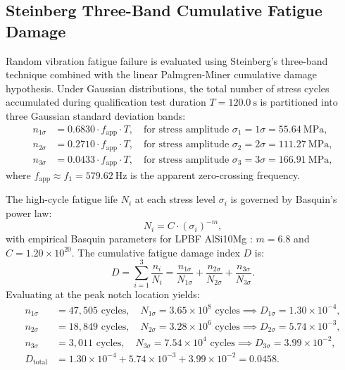 \subsection{Steinberg Three-Band Cumulative Fatigue Damage}

Random vibration fatigue failure is evaluated using Steinberg's three-band technique \cite{steinberg2000} combined with the linear Palmgren-Miner cumulative damage hypothesis. Under Gaussian distributions, the total number of stress cycles accumulated during qualification test duration $T = \SI{120.0}{\second}$ is partitioned into three Gaussian standard deviation bands:
\begin{align}
n_{1\sigma} &= 0.6830 \cdot f_{\text{app}} \cdot T, \quad \text{for stress amplitude } \sigma_1 = 1\sigma = \SI{55.64}{\mega\pascal}, \\
n_{2\sigma} &= 0.2710 \cdot f_{\text{app}} \cdot T, \quad \text{for stress amplitude } \sigma_2 = 2\sigma = \SI{111.27}{\mega\pascal}, \\
n_{3\sigma} &= 0.0433 \cdot f_{\text{app}} \cdot T, \quad \text{for stress amplitude } \sigma_3 = 3\sigma = \SI{166.91}{\mega\pascal},
\end{align}
where $f_{\text{app}} \approx f_1 = \SI{579.62}{\hertz}$ is the apparent zero-crossing frequency.

The high-cycle fatigue life $N_i$ at each stress level $\sigma_i$ is governed by Basquin's power law:
\begin{equation}
N_i = C \cdot (\sigma_i)^{-m},
\label{eq:ch4_basquin_law}
\end{equation}
with empirical Basquin parameters for LPBF AlSi10Mg \cite{collini2024}: $m = 6.8$ and $C = 1.20 \times 10^{20}$.
The cumulative fatigue damage index $D$ is:
\begin{equation}
D = \sum_{i=1}^3 \frac{n_i}{N_i} = \frac{n_{1\sigma}}{N_{1\sigma}} + \frac{n_{2\sigma}}{N_{2\sigma}} + \frac{n_{3\sigma}}{N_{3\sigma}}.
\label{eq:miner_sum}
\end{equation}
Evaluating at the peak notch location yields:
\begin{align}
n_{1\sigma} &= 47{,}505 \text{ cycles}, \quad N_{1\sigma} = 3.65 \times 10^8 \text{ cycles} \implies D_{1\sigma} = 1.30 \times 10^{-4}, \\
n_{2\sigma} &= 18{,}849 \text{ cycles}, \quad N_{2\sigma} = 3.28 \times 10^6 \text{ cycles} \implies D_{2\sigma} = 5.74 \times 10^{-3}, \\
n_{3\sigma} &= 3{,}011 \text{ cycles}, \quad N_{3\sigma} = 7.54 \times 10^4 \text{ cycles} \implies D_{3\sigma} = 3.99 \times 10^{-2}, \\
D_{\text{total}} &= 1.30 \times 10^{-4} + 5.74 \times 10^{-3} + 3.99 \times 10^{-2} = \mathbf{0.0458}.
\end{align}

